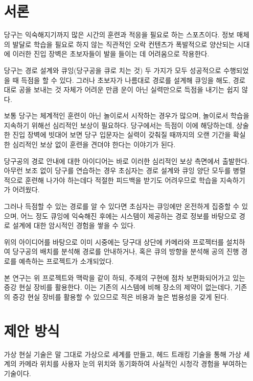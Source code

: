 \documentclass[10pt]{oblivoir}
\begin{document}
\section{서론}
당구는 익숙해지기까지 많은 시간의 훈련과 적응을 필요로 하는 스포츠이다. 정보 매체의 발달로 학습을 필요로 하지 않는 직관적인 오락 컨텐츠가 폭발적으로 양산되는 시대에 이러한 진입 장벽은 초보자들이 발을 들이는 데 어려움으로 작용한다.

당구는 경로 설계와 큐잉(당구공을 큐로 치는 것) 두 가지가 모두 성공적으로 수행되었을 때 득점을 할 수 있다. 그러나 초보자가 나름대로 경로를 설계해 큐잉을 해도, 경로대로 공을 보내는 것 자체가 어려운 만큼 운이 아닌 실력만으로 득점을 내기는 쉽지 않다.

보통 당구는 체계적인 훈련이 아닌 놀이로서 시작하는 경우가 많으며, 놀이로서 학습을 지속하기 위해선 심리적인 보상이 필요하다. 당구에서는 득점이 이에 해당하는데, 상술한 진입 장벽에 빗대어 보면 당구 입문자는 실력이 갖춰질 때까지의 오랜 기간을 확실한 심리적인 보상 없이 훈련을 견뎌야 한다는 이야기가 된다.


당구공의 경로 안내에 대한 아이디어는 바로 이러한 심리적인 보상 측면에서 출발한다. 아무런 보조 없이 당구를 연습하는 경우 초심자는 경로 설계와 큐잉 양단 모두를 병렬적으로 훈련해 나가야 하는데다 적절한 피드백을 받기도 어려우므로 학습을 지속하기가 어려웠다.

그러나 득점할 수 있는 경로를 알 수 있다면 초심자는 큐잉에만 온전하게 집중할 수 있으며, 어느 정도 큐잉에 익숙해진 후에는 시스템이 제공하는 경로 정보를 바탕으로 경로 설계에 대한 암시적인 경험을 쌓을 수 있다.

위의 아이디어를 바탕으로 이미 시중에는 당구대 상단에 카메라와 프로젝터를 설치하여 당구공의 배치를 분석해 경로를 안내하거나, 혹은 큐의 방향을 분석해 공의 진행 경로를 예측하는 프로젝트가 소개되었다.
\cite{AR-Pool-Projector} \cite{AR-Pool-Projector-2}

본 연구는 위 프로젝트와 맥락을 같이 하되, 주제의 구현에 점차 보편화되어가고 있는 증강 현실 장비를 활용한다. 이는 기존의 시스템에 비해 장소의 제약이 없는데다, 기존의 증강 현실 장비를 활용할 수 있으므로 적은 비용과 높은 범용성을 갖게 된다.


\section{제안 방식}
가상 현실 기술은 말 그대로 가상으로 세계를 만들고, 헤드 트래킹 기술을 통해 가상 세계의 카메라 위치를 사용자 눈의 위치와 동기화하여 사실적인 시청각 경험을 부여하는 기술이다.
\end{document}
